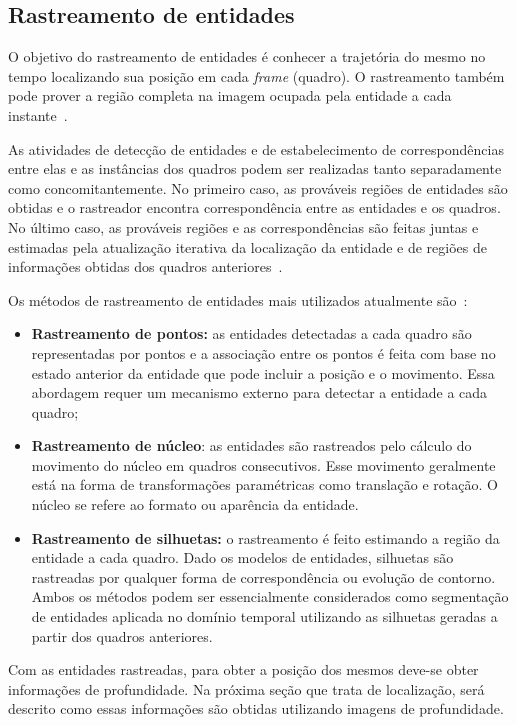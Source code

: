 
\subsection{Rastreamento de entidades}

	O objetivo do rastreamento de entidades é conhecer a trajetória do mesmo no
	tempo localizando sua posição em cada \textit{frame} (quadro). O rastreamento também pode
	prover a região completa na imagem ocupada pela entidade a cada
	instante~\cite{yilmaz}.

	As atividades de detecção de entidades e de estabelecimento de correspondências
	entre elas e as instâncias dos quadros podem ser realizadas tanto
	separadamente como concomitantemente. No primeiro caso, as prováveis regiões de
	entidades são obtidas e o rastreador encontra correspondência entre as entidades
	e os quadros. No último caso, as prováveis regiões e as correspondências
	são feitas juntas e estimadas pela atualização iterativa da localização da
	entidade e de regiões de informações obtidas dos quadros
	anteriores~\cite{yilmaz}.

	Os métodos de rastreamento de entidades mais utilizados atualmente são~\cite{yilmaz}:

	\begin{itemize}
		\item \textbf{Rastreamento de pontos:} as entidades detectadas a cada quadro
		são representadas por pontos e a associação entre os pontos é feita com base no
		estado anterior da entidade que pode incluir a posição e o movimento. Essa
		abordagem requer um mecanismo externo para detectar a entidade a cada
		quadro;
		
		\item \textbf{Rastreamento de núcleo}: as entidades são rastreados pelo cálculo
		do movimento do núcleo em quadros consecutivos. Esse movimento
		geralmente está na forma de transformações paramétricas como translação e
		rotação. O núcleo se refere ao formato ou aparência da entidade.
		
		\item \textbf{Rastreamento de silhuetas:} o rastreamento é feito estimando a
		região da entidade a cada quadro. 
		Dado os modelos de entidades, silhuetas são rastreadas por qualquer forma de
		correspondência ou evolução de contorno. Ambos os métodos podem ser
		essencialmente considerados como segmentação de entidades aplicada no domínio
		temporal utilizando as silhuetas geradas a partir dos quadros
		anteriores.
	\end{itemize}

Com as entidades rastreadas, para obter a posição dos mesmos deve-se obter
informações de profundidade. Na próxima seção que trata de localização, será descrito como essas
informações são obtidas utilizando imagens de profundidade.




